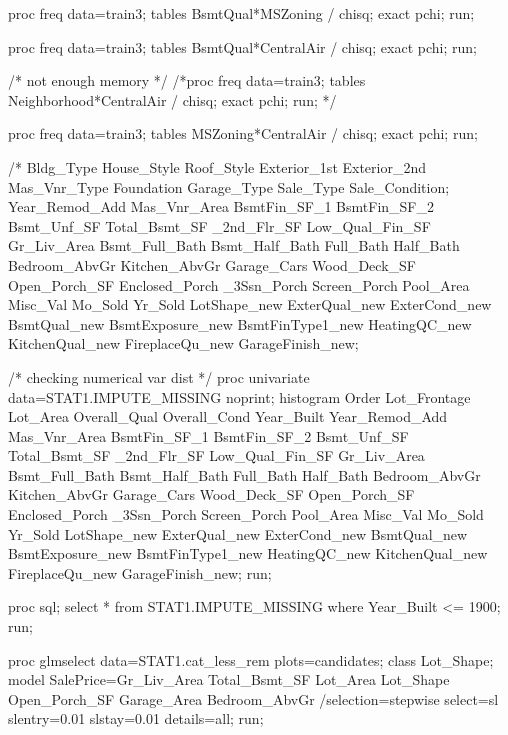 proc freq data=train3;
tables BsmtQual*MSZoning / chisq;
exact pchi;
run;

proc freq data=train3;
tables BsmtQual*CentralAir / chisq;
exact pchi;
run;

/* not enough memory */
/*proc freq data=train3;
tables Neighborhood*CentralAir / chisq;
exact pchi;
run;
 */

proc freq data=train3;
tables MSZoning*CentralAir / chisq;
exact pchi;
run;





/*%
		Bldg_Type House_Style Roof_Style Exterior_1st Exterior_2nd Mas_Vnr_Type 
		Foundation Garage_Type Sale_Type Sale_Condition;
		Year_Remod_Add Mas_Vnr_Area BsmtFin_SF_1 BsmtFin_SF_2 Bsmt_Unf_SF 
		Total_Bsmt_SF _2nd_Flr_SF Low_Qual_Fin_SF Gr_Liv_Area Bsmt_Full_Bath 
		Bsmt_Half_Bath Full_Bath Half_Bath Bedroom_AbvGr Kitchen_AbvGr Garage_Cars 
		Wood_Deck_SF Open_Porch_SF Enclosed_Porch _3Ssn_Porch Screen_Porch Pool_Area 
		Misc_Val Mo_Sold Yr_Sold LotShape_new ExterQual_new ExterCond_new 
		BsmtQual_new BsmtExposure_new BsmtFinType1_new HeatingQC_new KitchenQual_new 
		FireplaceQu_new GarageFinish_new;


/* checking numerical var dist */ 
proc univariate data=STAT1.IMPUTE_MISSING noprint;
	histogram Order Lot_Frontage Lot_Area Overall_Qual Overall_Cond Year_Built 
		Year_Remod_Add Mas_Vnr_Area BsmtFin_SF_1 BsmtFin_SF_2 Bsmt_Unf_SF 
		Total_Bsmt_SF _2nd_Flr_SF Low_Qual_Fin_SF Gr_Liv_Area Bsmt_Full_Bath 
		Bsmt_Half_Bath Full_Bath Half_Bath Bedroom_AbvGr Kitchen_AbvGr Garage_Cars 
		Wood_Deck_SF Open_Porch_SF Enclosed_Porch _3Ssn_Porch Screen_Porch Pool_Area 
		Misc_Val Mo_Sold Yr_Sold LotShape_new ExterQual_new ExterCond_new 
		BsmtQual_new BsmtExposure_new BsmtFinType1_new HeatingQC_new KitchenQual_new 
		FireplaceQu_new GarageFinish_new;
run;


proc sql;
	select * from STAT1.IMPUTE_MISSING where Year_Built <= 1900;
	run;
	
proc glmselect data=STAT1.cat_less_rem plots=candidates;
	class Lot_Shape;
	model SalePrice=Gr_Liv_Area Total_Bsmt_SF Lot_Area  
		 Lot_Shape  
		Open_Porch_SF Garage_Area Bedroom_AbvGr /selection=stepwise select=sl 
		slentry=0.01 slstay=0.01 details=all;
run;